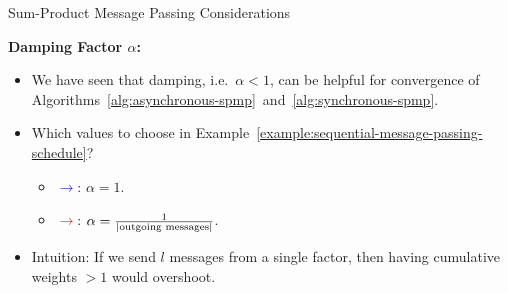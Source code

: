 \begin{frame}{Sum-Product Message Passing Considerations}
\begin{minipage}[t]{0.6\textwidth}
\begin{example}
\begin{center}
\end{center}
\end{example}
\end{minipage}
 \pause
\begin{minipage}[t]{0.39\textwidth}
    \textbf{Damping Factor $\alpha$:}
\begin{itemize}
    \item We have seen that damping, i.e.\ $\alpha < 1$, can be helpful for convergence of Algorithms~\ref{alg:asynchronous-spmp}~and~\ref{alg:synchronous-spmp}.
 \pause
    \item Which values to choose in Example~\ref{example:sequential-message-passing-schedule}?
    \begin{itemize}
 \pause
        \item \textcolor{blue}{$\rightarrow$}: $\alpha = 1$.
 \pause
        \item \textcolor{red}{$\rightarrow$}: $\alpha = \frac{1}{|\text{outgoing messages}|}$.
    \end{itemize}
 \pause
    \item Intuition: If we send $l$ messages from a single factor, then having cumulative weights $>1$ would overshoot.
\end{itemize}
\end{minipage}
\end{frame}

